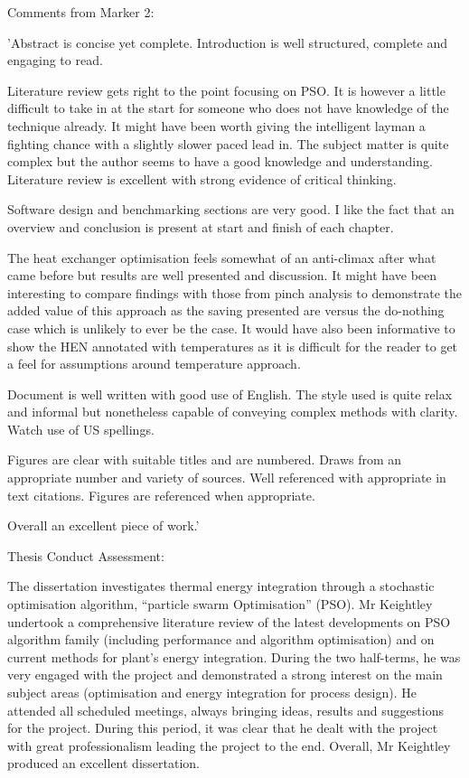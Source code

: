 \documentclass[14pt,twoside]{report}
\begin{document}
\bigskip
\noindent
{\Large Comments from Marker 2:}

'Abstract is concise yet complete. Introduction is well structured, complete and engaging to read.

Literature review gets right to the point focusing on PSO. It is however a little difficult to take in at the start for someone who does not have knowledge of the technique already. It might have been worth giving the intelligent layman a fighting chance with a slightly slower paced lead in. The subject matter is quite complex but the author seems to have a good knowledge and understanding. Literature review is excellent with strong evidence of critical thinking. 

Software design and benchmarking sections are very good. I like the fact that an overview and conclusion is present at start and finish of each chapter.

The heat exchanger optimisation feels somewhat of an anti-climax after what came before but results are well presented and discussion. It might have been interesting to compare findings with those from pinch analysis to demonstrate the added value of this approach as the saving presented are versus the do-nothing case which is unlikely to ever be the case. It would have also been informative to show the HEN annotated with temperatures as it is difficult for the reader to get a feel for assumptions around temperature approach. 

Document is well written with good use of English. The style used is quite relax and informal but nonetheless capable of conveying complex methods with clarity. Watch use of US spellings.

Figures are clear with suitable titles and are numbered. Draws from an appropriate number and variety of sources. Well referenced with appropriate in text citations. Figures are referenced when appropriate.

Overall an excellent piece of work.'

\clearpage
\noindent
{\Large Thesis Conduct Assessment:}

The dissertation investigates thermal energy integration through a stochastic optimisation algorithm, “particle swarm Optimisation” (PSO). Mr Keightley undertook a comprehensive literature review of the latest developments on PSO algorithm family (including performance and algorithm optimisation) and on current methods for plant’s energy integration. During the two half-terms, he was very engaged with the project and demonstrated a strong interest on the main subject areas (optimisation and energy integration for process design). He attended all scheduled meetings, always bringing ideas, results and suggestions for the project. During this period, it was clear that he dealt with the project with great professionalism leading the project to the end. Overall, Mr Keightley produced an excellent dissertation.
\end{document}
